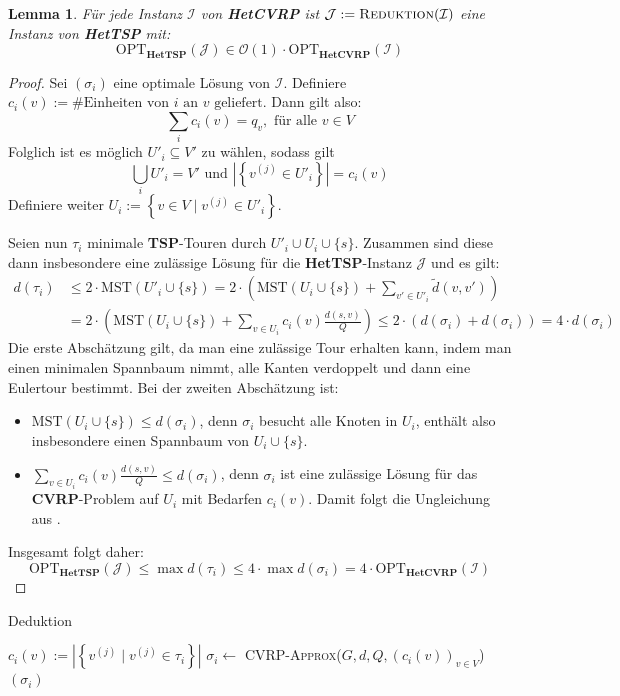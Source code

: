 \documentclass[a4paper,ngerman,12pt,bibtotoc]{scrartcl}
\theoremstyle{definition}
\theoremstyle{plain}
\newtheorem{lemma}[defn]{Lemma}
\theoremstyle{remark}
\newcommand{\Ic}{\mathcal{I}}
\newcommand{\Jc}{\mathcal{J}}
\newcommand{\Oc}{\mathcal{O}}
\newcommand{\OPT}{\mathrm{OPT}}
\newcommand{\MST}{\mathrm{MST}}
\newcommand{\TSP}{\textbf{TSP}}
\newcommand{\HetTSP}{\textbf{HetTSP}}
\newcommand{\CVRP}{\textbf{CVRP}}
\newcommand{\HetCVRP}{\textbf{HetCVRP}}
\begin{document}
	\begin{lemma}
		Für jede Instanz $\Ic$ von \HetCVRP{} ist $\Jc := \textsc{Reduktion}(\Ic)$ eine Instanz von \HetTSP{} mit:
			\[\OPT_\HetTSP(\Jc) \in \Oc(1)\cdot\OPT_\HetCVRP(\Ic)\]
	\end{lemma}
	
	\begin{proof}
		Sei $(\sigma_i)$ eine optimale Lösung von $\Ic$. Definiere $c_i(v) := \#\text{Einheiten von }i\text{ an }v\text{ geliefert}$. Dann gilt also:
			\[\sum_i c_i(v) = q_v, \text{ für alle } v \in V\]
		Folglich ist es möglich $U'_i \subseteq V'$ zu wählen, sodass gilt
			\[\bigcup_i U'_i = V' \text{ und } \left|\left\lbrace v^{(j)} \in U'_i \right\rbrace\right| = c_i(v)\]
		Definiere weiter $U_i := \left\lbrace v \in V \mid v^{(j)} \in U'_i\right\rbrace$.
		
		Seien nun $\tau_i$ minimale \TSP-Touren durch $U'_i \cup U_i \cup \{s\}$. Zusammen sind diese dann insbesondere eine zulässige Lösung für die \HetTSP-Instanz $\Jc$ und es gilt:
		\begin{align*}
			d(\tau_i) &\leq 2\cdot \MST(U'_i \cup \{s\}) = 2\cdot \left(\MST(U_i \cup \{s\}) + \sum_{v' \in U'_i} \tilde{d}(v,v')\right) \\
					  &= 2\cdot \left(\MST(U_i \cup \{s\}) + \sum_{v \in U_i}c_i(v)\frac{d(s,v)}{Q}\right) \leq 2\cdot \left(d(\sigma_i) + d(\sigma_i)\right) = 4 \cdot d(\sigma_i)
		\end{align*}
		Die erste Abschätzung gilt, da man eine zulässige Tour erhalten kann, indem man einen minimalen Spannbaum nimmt, alle Kanten verdoppelt und dann eine Eulertour bestimmt. Bei der zweiten Abschätzung ist:
		\begin{itemize}
			\item $\MST(U_i \cup \{s\}) \leq d(\sigma_i)$, denn $\sigma_i$ besucht alle Knoten in $U_i$, enthält also insbesondere einen Spannbaum von $U_i \cup \{s\}$.
			\item $\sum_{v \in U_i}c_i(v)\frac{d(s,v)}{Q} \leq d(\sigma_i)$, denn $\sigma_i$ ist eine zulässige Lösung für das \CVRP-Problem auf $U_i$ mit Bedarfen $c_i(v)$. Damit folgt die Ungleichung aus .
		\end{itemize}
		
		Insgesamt folgt daher:
			\[\OPT_\HetTSP(\Jc) \leq \max d(\tau_i) \leq 4\cdot \max d(\sigma_i) = 4\cdot \OPT_\HetCVRP(\Ic)\]
	\end{proof}

	\begin{algorithm}[H]
		\caption{Deduktion}\label{AlgDeduktion}
		\begin{algorithmic}[1]
			\Procedure{Deduktion}{$\Ic, \Jc, (\tau_i)$}
				\State $c_i(v) := \left|\left\lbrace v^{(j)} \mid v^{(j)} \in \tau_i \right\rbrace\right|$
				\State $\sigma_i \gets $ \textsc{CVRP-Approx}($G, d, Q, \left(c_i(v)\right)_{v\in V}$)
			\EndFor
			\State \Return $\left(\sigma_i\right)$
			\EndProcedure
		\end{algorithmic}
	\end{algorithm}	
	
\end{document}
